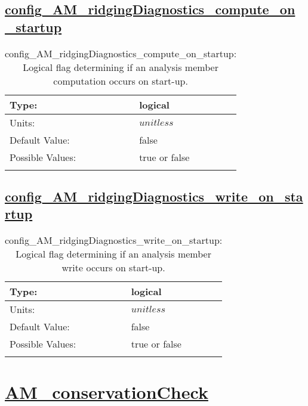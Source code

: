 \subsection[config\_AM\_ridgingDiagnostics\_compute\_on\_startup]{\hyperref[sec:nm_tab_AM_ridgingDiagnostics]{config\_AM\_ridgingDiagnostics\_compute\_on\_startup}}
\label{subsec:nm_sec_config_AM_ridgingDiagnostics_compute_on_startup}
\begin{center}
\begin{longtable}{| p{2.0in} || p{4.0in} |}
    \hline
    Type: & logical \\
    \hline
    Units: & $unitless$ \\
    \hline
    Default Value: & false \\
    \hline
    Possible Values: & true or false \\
    \hline
    \caption{config\_AM\_ridgingDiagnostics\_compute\_on\_startup: Logical flag determining if an analysis member computation occurs on start-up.}
\end{longtable}
\end{center}
\subsection[config\_AM\_ridgingDiagnostics\_write\_on\_startup]{\hyperref[sec:nm_tab_AM_ridgingDiagnostics]{config\_AM\_ridgingDiagnostics\_write\_on\_startup}}
\label{subsec:nm_sec_config_AM_ridgingDiagnostics_write_on_startup}
\begin{center}
\begin{longtable}{| p{2.0in} || p{4.0in} |}
    \hline
    Type: & logical \\
    \hline
    Units: & $unitless$ \\
    \hline
    Default Value: & false \\
    \hline
    Possible Values: & true or false \\
    \hline
    \caption{config\_AM\_ridgingDiagnostics\_write\_on\_startup: Logical flag determining if an analysis member write occurs on start-up.}
\end{longtable}
\end{center}
\section[AM\_conservationCheck]{\hyperref[sec:nm_tab_AM_conservationCheck]{AM\_conservationCheck}}
\label{sec:nm_sec_AM_conservationCheck}
